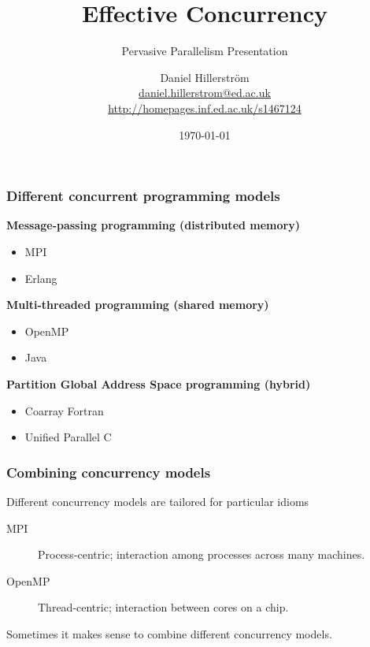 \documentclass[10pt,compress]{beamer}
\author[Daniel Hillerström]{Daniel Hillerström\\\footnotesize{\href{mailto:daniel.hillerstrom@ed.ac.uk}{daniel.hillerstrom@ed.ac.uk}}\\\footnotesize{\href{http://homepages.inf.ed.ac.uk/s1467124}{http://homepages.inf.ed.ac.uk/s1467124}}}
\institute[University of Edinburgh]{CDT Pervasive Parallelism, University of Edinburgh}
\date{\today}
\title{Effective Concurrency} %
\subtitle{Pervasive Parallelism Presentation}
\begin{document}
  \maketitle

  \begin{frame}
    \frametitle{Different concurrent programming models}
    \textbf{Message-passing programming (distributed memory)}
    \begin{itemize}
      \item MPI
      \item Erlang
    \end{itemize}
    \textbf{Multi-threaded programming (shared memory)}
    \begin{itemize}
      \item OpenMP
      \item Java
    \end{itemize}
    \textbf{Partition Global Address Space programming (hybrid)}
    \begin{itemize}
      \item Coarray Fortran
      \item Unified Parallel C
    \end{itemize}
  \end{frame}

  \begin{frame}
    \frametitle{Combining concurrency models}
    Different concurrency models are tailored for particular idioms
    \begin{description}
      \item[\alert<1->{MPI}] Process-centric; interaction among processes across many machines.
      \item[\alert<1->{OpenMP}] Thread-centric; interaction between cores on a chip.
    \end{description}
    Sometimes it makes sense to combine different concurrency models.
  \end{frame}
\end{document}
